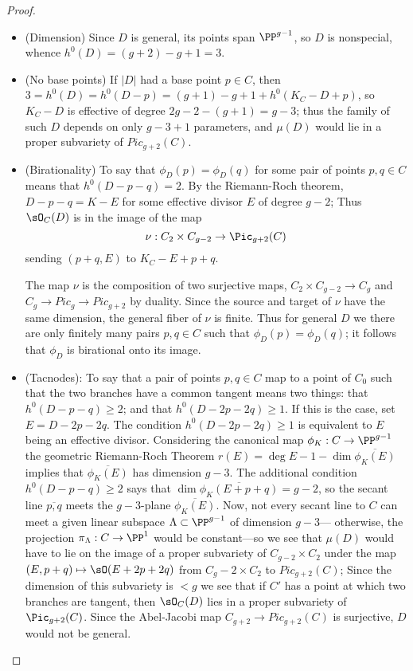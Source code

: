 \begin{proof}
\begin{itemize}
\item (Dimension) Since $D$ is general, its points span $\PP^{g-1}$,
so $D$ is nonspecial, whence $h^0(D) = (g+2)-g+1 = 3.$

\item (No base points) If $|D|$ had a base point $p\in C$, then $3=h^0(D) = h^0(D-p) = (g+1)-g+1+h^0(K_C-D+p)$,
so $K_C-D$ is effective of degree $2g-2-(g+1) =g-3$; thus the family of such $D$ depends on only $g-3+1$ parameters,
and $\mu(D)$ would lie in a proper subvariety of $Pic_{g+2}(C).$

\item (Birationality)
 To say that $\phi_D(p) = \phi_D(q)$ for some pair of points $p, q \in C$   means that $h^0(D-p-q) = 2$. By the Riemann-Roch
 theorem, $D-p-q = K-E$ for some effective divisor $E$ of degree $g-2$; Thus $\sO_C(D)$ is in the image of the map
$$
\nu : C_2 \times C_{g-2} \to \Pic_{g+2}(C)
$$
sending $(p+q, E)$ to $K_C - E + p + q$. 

The map $\nu$ is 
the composition of two surjective maps, $C_2 \times C_{g-2} \to C_g$ and $C_g\to Pic_g \to Pic_{g+2}$ by duality. Since the source and target of $\nu$ have the same dimension, the general fiber of $\nu$ is finite. Thus for general $D$ we  there are only finitely many pairs $p, q \in C$ such that $\phi_D(p) = \phi_D(q)$; it follows that $\phi_D$ is birational onto its image.


\item (Tacnodes):  To say that a pair of points $p, q \in C$ map to a point of $C_0$ such that the 
two branches have a common tangent means two things: that $h^0(D-p-q) \geq 2$; and that $h^0(D-2p-2q) \geq 1$. If this is the case, set $E = D - 2p - 2q$.  The condition $h^0(D-2p-2q) \geq 1$ is equivalent to  $E$ being an effective divisor. Considering the canonical map $\phi_K: C\to \PP^{g-1}$ 
the geometric Riemann-Roch Theorem $r(E) = \deg E -1-\dim\overline{\phi_K(E)}$ implies that $\overline {\phi_K(E)}$ has dimension $g-3$. The additional condition $h^0(D-p-q) \geq 2$ says that $\dim\overline{\phi_K(E+p+q)} = g-2$,
so the secant line $\overline{p,q}$ meets the $g-3$-plane $\overline{\phi_K(E)}$. Now, not every secant line to $C$ can meet a given linear subspace $\Lambda \subset \PP^{g-1}$ of dimension $g-3$--- otherwise, the projection $\pi_\Lambda : C \to \PP^1$ would be constant---so we see that $\mu(D)$ would have to lie on the image of a proper subvariety of $C_{g-2} \times C_2$ under the map $(E, p+q) \mapsto \sO(E+2p+2q)$ from $C_g-2 \times C_2$ to $Pic_{g+2}(C)$;
Since the dimension of this subvariety is $<g$ we see that if $C'$ has
a point at which two branches are tangent, then $\sO_C(D)$ lies in a proper subvariety of $\Pic_{g+2}(C)$. Since
the Abel-Jacobi map $C_{g+2} \to Pic_{g+2}(C)$ is surjective,
 $D$ would not be general. 
 


\end{itemize}
\end{proof}
